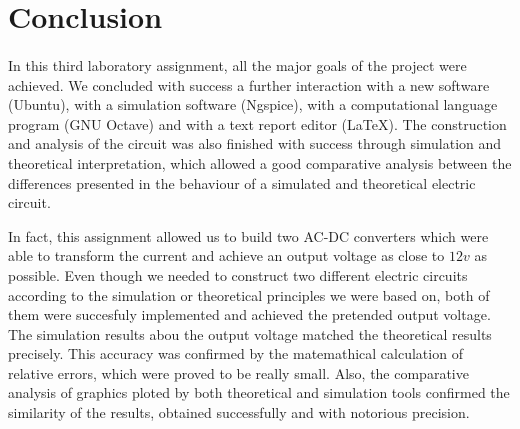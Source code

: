\section{Conclusion}
\label{sec:conclusion}

\paragraph{}
In this third laboratory assignment, all the major goals of the project were achieved. We concluded with success a further interaction with a new software (Ubuntu), with a simulation software (Ngspice), with a computational language program (GNU Octave) and with a text report editor (LaTeX). The construction and analysis of the circuit was also finished with success through simulation and theoretical interpretation, which allowed a good comparative analysis between the differences presented in the behaviour of a simulated and theoretical electric circuit. 

In fact, this assignment allowed us to build two AC-DC converters which were able to transform the current and achieve an output voltage as close to $12v$ as possible. Even though we needed to construct two different electric circuits according to the simulation or theoretical principles we were based on, both of them were succesfuly implemented and achieved the pretended output voltage. 
The simulation results abou the output voltage matched the theoretical results precisely. This accuracy was confirmed by the matemathical calculation of relative errors, which were proved to be really small. Also, the comparative analysis of graphics ploted by both theoretical and simulation tools confirmed the similarity of the results, obtained successfully and with notorious precision.
